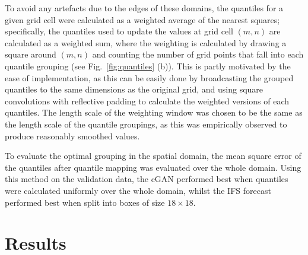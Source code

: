 \documentclass{article}
\begin{document}
To avoid any artefacts due to the edges of these domains, the quantiles for a given grid cell were calculated as a weighted average of the nearest squares; specifically, the quantiles used to update the values at grid cell $(m,n)$ are calculated as a weighted sum, where the weighting is calculated by drawing a square around $(m,n)$ and counting the number of grid points that fall into each quantile grouping (see Fig.~\ref{fig:quantiles} (b)). This is partly motivated by the ease of implementation, as this can be easily done by broadcasting the grouped quantiles to the same dimensions as the original grid, and using square convolutions with reflective padding to calculate the weighted versions of each quantiles. The length scale of the weighting window was chosen to be the same as the length scale of the quantile groupings, as this was empirically observed to produce reasonably smoothed values.

To evaluate the optimal grouping in the spatial domain, the mean square error of the quantiles after quantile mapping was evaluated over the whole domain. Using this method on the validation data, the cGAN performed best when quantiles were calculated uniformly over the whole domain, whilst the IFS forecast performed best when split into boxes of size $18 \times 18$. 





\section{Results}
\end{document}

